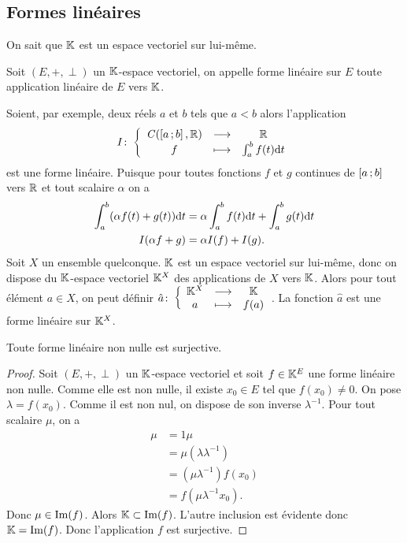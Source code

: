 \subsection{Formes linéaires}
On sait que \(\mathbb{K}\) est un espace vectoriel sur lui-même.
\begin{defdef}
  Soit \((E,+,\perp)\) un \(\mathbb{K}\)-espace vectoriel, on appelle forme linéaire sur 
  \(E\) toute application linéaire de \(E\) vers \(\mathbb{K}\).
\end{defdef}

Soient, par exemple, deux réels \(a\) et \(b\) tels que \(a<b\) alors 
l'application
\begin{equation}
  I\colon \left\{\begin{array}{ccc} \mathit{C}(\left[ a \, ;  b \right],\mathbb{R}) & \longrightarrow &\mathbb{R}\\ f & \longmapsto & \int_{a}^b f(t)\mathrm{d} t \end{array} \right.
\end{equation}
est une forme linéaire. Puisque pour toutes fonctions \(f\) et \(g\) continues 
de \(\left[ a \, ;  b \right]\) vers \(\mathbb{R}\) et tout scalaire \(\alpha\) on a
\begin{align}
  \int_{a}^b (\alpha f(t)+g(t))\mathrm{d} t &= \alpha \int_{a}^b f(t)\mathrm{d} t + \int_{a}^b 
  g(t)\mathrm{d} t \\
  I(\alpha f+g)&=\alpha I(f)+I(g).
\end{align}
Soit \(X\) un ensemble quelconque. \(\mathbb{K}\) est un espace vectoriel sur lui-même, 
donc on dispose du \(\mathbb{K}\)-espace vectoriel \(\mathbb{K}^X\) des applications de \(X\) 
vers \(\mathbb{K}\). Alors pour tout élément \(a \in X\), on peut définir 
\(\hat{a}\colon \left\{\begin{array}{ccc} \mathbb{K}^X & \longrightarrow &\mathbb{K}\\ a & \longmapsto & f(a) \end{array} \right.\). La fonction \(\hat{a}\) est une forme 
linéaire sur \(\mathbb{K}^X\).
\begin{theo}
  Toute forme linéaire non nulle est surjective.
\end{theo}
\begin{proof}
  Soit \((E,+,\perp)\) un \(\mathbb{K}\)-espace vectoriel et soit \(f \in \mathbb{K}^E\) une 
  forme linéaire non nulle. Comme elle est non nulle, il existe \(x_0 \in E\) 
  tel que \(f(x_0)\neq 0\). On pose \(\lambda =f(x_0)\). Comme il est non nul, 
  on dispose de son inverse \(\lambda^{-1}\). Pour tout scalaire \(\mu\), on a
  \begin{align}
    \mu & =1 \mu \\
    &= \mu (\lambda \lambda^{-1})\\
    &=(\mu\lambda^{-1})f(x_0)\\
    &=f(\mu\lambda^{-1}x_0).
  \end{align}
  Donc \(\mu \in \operatorname{Im}(f)\). Alors \(\mathbb{K} \subset \operatorname{Im}(f)\). L'autre inclusion 
  est évidente donc \(\mathbb{K}=\operatorname{Im}(f)\). Donc l'application \(f\) est surjective.
\end{proof}

